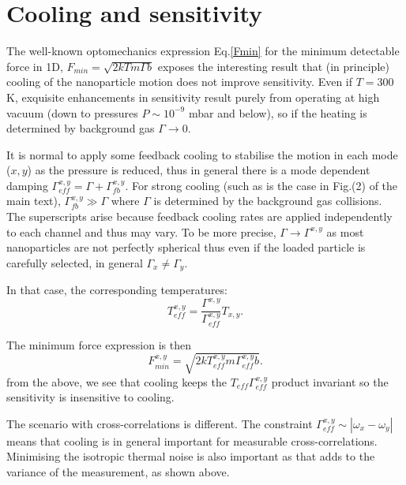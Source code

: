 \documentclass[twocolumn,english,notitlepage,superscriptaddress,nofootinbib]{revtex4-2}
\begin{document}
\section{Cooling and sensitivity}

The well-known optomechanics expression Eq.\ref{Fmin} for the minimum detectable force in 1D, $F_{min}= \sqrt{2 k T m \Gamma b}$  exposes the interesting result that (in principle) cooling of the nanoparticle motion does not improve sensitivity.  Even if $T= 300$K,   exquisite enhancements in sensitivity result purely from operating at high vacuum (down to pressures $P\sim 10^{-9}$ mbar and below),  so if the heating is determined by background gas $\Gamma\to 0$.

It is normal to apply some feedback cooling to stabilise the motion in each mode ($x,y$) as the pressure is reduced,  thus 
in general there is a mode dependent damping $\Gamma^{x,y}_{eff}= \Gamma+ \Gamma^{x,y}_{fb}$.  For strong cooling (such as is the case in Fig.(2) of the main text),  $\Gamma^{x,y}_{fb} \gg  \Gamma$ where $\Gamma$ is determined by the background gas collisions. The superscripts arise because feedback cooling rates are applied independently to each channel and thus may vary.  To be more precise,  $\Gamma \to \Gamma^{x,y}$ as most nanoparticles are not perfectly spherical thus even if the loaded particle is carefully selected,  in general $\Gamma_x \neq \Gamma_y$.

In that case, the corresponding temperatures:
\begin{equation}
 T^{x,y}_{eff}= \frac{\Gamma^{x,y}}{\Gamma^{x,y}_{eff} }T_{x,y}.
\end{equation}

The minimum force expression is then
\begin{equation}\label{FminEff}
 F^{x,y}_{min}= \sqrt{2 k T^{x,y}_{eff} m \Gamma^{x,y}_{eff} b}.
\end{equation}
from the above, we see that cooling keeps the $T_{eff}  \Gamma^{x,y}_{eff}$ product invariant so the sensitivity is insensitive to cooling.

The scenario with cross-correlations is different.  The constraint $\Gamma_{eff}^{x,y} \sim |\omega_x-\omega_y|$ means that cooling is in general important for measurable cross-correlations.   Minimising the isotropic thermal noise is also important as that adds to the variance of the measurement, as shown above.

\end{document}
